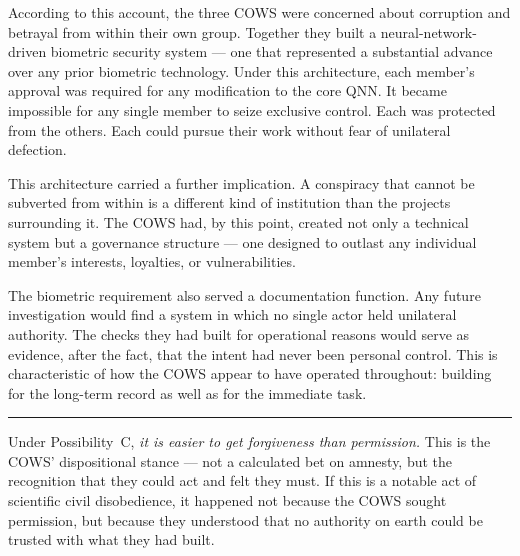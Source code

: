 According to this account, the three COWS were concerned about corruption and betrayal from within their own group. Together they built a neural-network-driven biometric security system --- one that represented a substantial advance over any prior biometric technology. Under this architecture, each member's approval was required for any modification to the core QNN. It became impossible for any single member to seize exclusive control. Each was protected from the others. Each could pursue their work without fear of unilateral defection.

This architecture carried a further implication. A conspiracy that cannot be subverted from within is a different kind of institution than the projects surrounding it. The COWS had, by this point, created not only a technical system but a governance structure --- one designed to outlast any individual member's interests, loyalties, or vulnerabilities.

The biometric requirement also served a documentation function. Any future investigation would find a system in which no single actor held unilateral authority. The checks they had built for operational reasons would serve as evidence, after the fact, that the intent had never been personal control. This is characteristic of how the COWS appear to have operated throughout: building for the long-term record as well as for the immediate task.

\vspace{1cm}\noindent\rule{0.5\textwidth}{0.5pt}\vspace{0.5cm}

Under Possibility~C, \textit{it is easier to get forgiveness than permission.} This is the COWS' dispositional stance --- not a calculated bet on amnesty, but the recognition that they could act and felt they must. If this is a notable act of scientific civil disobedience, it happened not because the COWS sought permission, but because they understood that no authority on earth could be trusted with what they had built.

\chapterreturn
